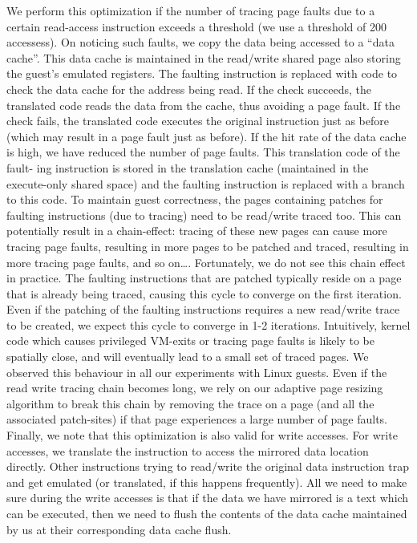 We perform this optimization if the number of tracing page faults due to a certain read-access instruction exceeds a threshold (we use a threshold of 200 accessess). On noticing such faults, we copy the data being accessed to a “data cache”. This data cache is maintained in the read/write shared page also storing the guest’s emulated registers. The faulting instruction is replaced with code to check the data cache for the address being read. If the check succeeds, the translated code reads the data from the cache, thus avoiding a page fault. If the check fails, the translated code executes the original instruction just as before (which may result in a page fault just as before). If the hit rate of the data cache is high, we have reduced the number of page faults. This translation code of the fault- ing instruction is stored in the translation cache (maintained in the execute-only shared space) and the faulting instruction is replaced with a branch to this code. 
To maintain guest correctness, the pages containing patches for faulting instructions (due to tracing) need to be read/write traced too. This can potentially result in a chain-effect: tracing of these new pages can cause more tracing page faults, resulting in more pages to be patched and traced, resulting in more tracing page faults, and so on\ldots. Fortunately, we do not see this chain effect in practice. The faulting instructions that are patched typically reside on a page that is already being traced, causing this cycle to converge on the first iteration. Even if the patching of the faulting instructions requires a new read/write trace to be created, we expect this cycle to converge in 1-2 iterations. Intuitively, kernel code which causes privileged VM-exits or tracing page faults is likely to be spatially close, and will eventually lead to a small set of traced pages. We observed this behaviour in all our experiments with Linux guests. Even if the read write tracing chain becomes long, we rely on our adaptive page resizing algorithm to break this chain by removing the trace on a page (and all the associated patch-sites) if that page experiences a large number of page faults. 
Finally, we note that this optimization is also valid for write accesses. For write accesses, we translate the instruction to access the  mirrored data location directly. Other instructions trying to read/write the original data instruction trap and get emulated (or translated, if this happens frequently). All we need to make sure during the write accesses is that if the data we have mirrored is a text which can be executed, then we need to flush the contents of the data cache maintained by us at their corresponding data cache flush.

